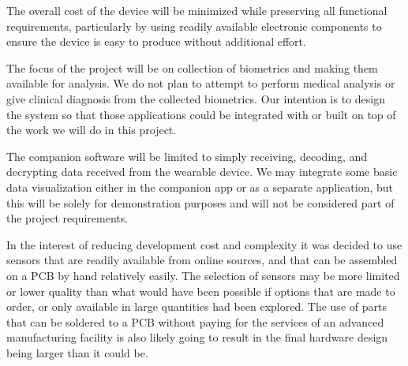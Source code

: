 The overall cost of the device will be minimized while preserving all functional
requirements, particularly by using readily available electronic components to
ensure the device is easy to produce without additional effort.

The focus of the project will be on collection of biometrics and making them
available for analysis. We do not plan to attempt to perform medical analysis
or give clinical diagnosis from the collected biometrics. Our intention is to
design the system so that those applications could be integrated with or built
on top of the work we will do in this project.

The companion software will be limited to simply receiving, decoding, and
decrypting data received from the wearable device. We may integrate some basic
data visualization either in the companion app or as a separate application, but
this will be solely for demonstration purposes and will not be considered part
of the project requirements.

In the interest of reducing development cost and complexity it was decided to
use sensors that are readily available from online sources, and that can be
assembled on a PCB by hand relatively easily.  The selection of sensors may be
more limited or lower quality than what would have been possible if options
that are made to order, or only available in large quantities had been
explored.  The use of parts that can be soldered to a PCB without paying for
the services of an advanced manufacturing facility is also likely going to
result in the final hardware design being larger than it could be.
